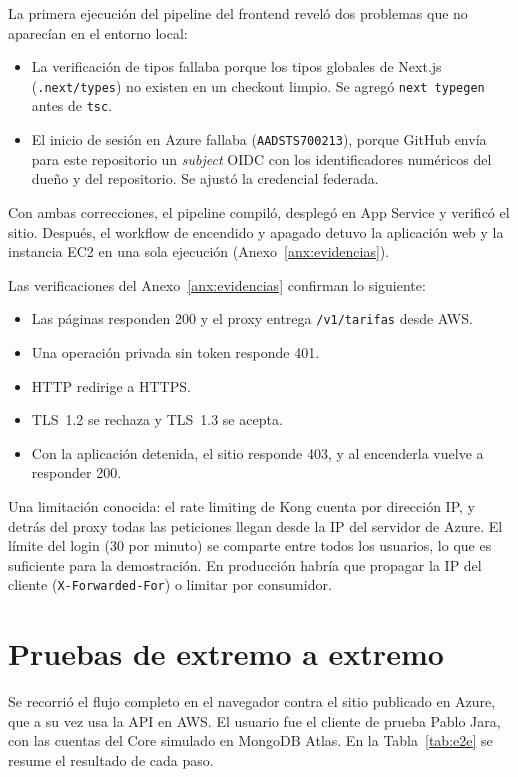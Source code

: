 La primera ejecución del pipeline del frontend reveló dos problemas que no aparecían en el entorno local:
\begin{itemize}
  \item La verificación de tipos fallaba porque los tipos globales de Next.js (\texttt{.next/types}) no existen en un checkout limpio. Se agregó \texttt{next typegen} antes de \texttt{tsc}.
  \item El inicio de sesión en Azure fallaba (\texttt{AADSTS700213}), porque GitHub envía para este repositorio un \emph{subject} OIDC con los identificadores numéricos del dueño y del repositorio. Se ajustó la credencial federada.
\end{itemize}
Con ambas correcciones, el pipeline compiló, desplegó en App Service y verificó el sitio. Después, el workflow de encendido y apagado detuvo la aplicación web y la instancia EC2 en una sola ejecución (Anexo~\ref{anx:evidencias}).

Las verificaciones del Anexo~\ref{anx:evidencias} confirman lo siguiente:
\begin{itemize}
  \item Las páginas responden 200 y el proxy entrega \texttt{/v1/tarifas} desde AWS.
  \item Una operación privada sin token responde 401.
  \item HTTP redirige a HTTPS.
  \item TLS~1.2 se rechaza y TLS~1.3 se acepta.
  \item Con la aplicación detenida, el sitio responde 403, y al encenderla vuelve a responder 200.
\end{itemize}

Una limitación conocida: el rate limiting de Kong cuenta por dirección IP, y detrás del proxy todas las peticiones llegan desde la IP del servidor de Azure. El límite del login (30 por minuto) se comparte entre todos los usuarios, lo que es suficiente para la demostración. En producción habría que propagar la IP del cliente (\texttt{X-Forwarded-For}) o limitar por consumidor.

\section{Pruebas de extremo a extremo}

Se recorrió el flujo completo en el navegador contra el sitio publicado en Azure, que a su vez usa la API en AWS. El usuario fue el cliente de prueba Pablo Jara, con las cuentas del Core simulado en MongoDB Atlas. En la Tabla~\ref{tab:e2e} se resume el resultado de cada paso.

